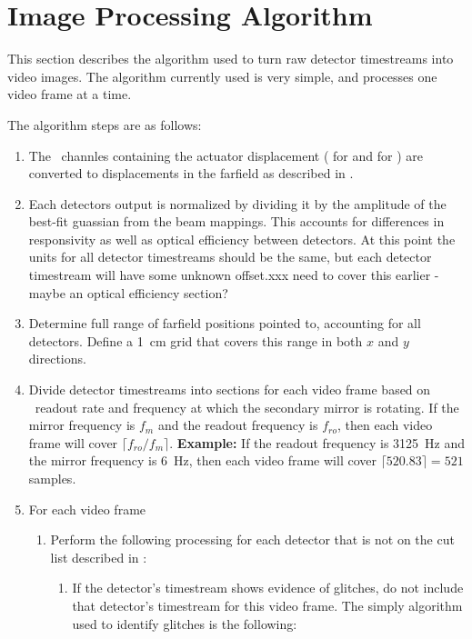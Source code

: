 \section{Image Processing Algorithm} \label{sec:ch8-algo}

This section describes the algorithm used to turn raw detector timestreams into video images.
The algorithm currently used is very simple, and processes one video frame at a time.

The algorithm steps are as follows:
\begin{enumerate}
\item The  \MCE\ channles containing the actuator displacement ( for  and  for ) are converted to displacements in the farfield as described in .
\item Each detectors output is normalized by dividing it by the amplitude of the best-fit guassian from the beam mappings. This accounts for differences in responsivity as well as optical efficiency between detectors. At this point the units for all detector timestreams should be the same, but each detector timestream will have some unknown offset.xxx need to cover this earlier - maybe an optical efficiency section?
\item Determine full range of farfield positions pointed to, accounting for all detectors. Define a \SI{1}{\cm} grid that covers this range in both $x$ and $y$ directions.
\item Divide detector timestreams into sections for each video frame based on \MCE\ readout rate and frequency at which the secondary mirror is rotating.
  If the mirror frequency is $f_m$ and the readout frequency is $f_{ro}$, then each video frame will cover $\lceil f_{ro} / f_{m} \rceil$.
  \textbf{Example:} If the readout frequency is \SI{3125}{\Hz} and the mirror frequency is \SI{6}{\Hz}, then each video frame will cover $\lceil 520.83 \rceil = 521$ samples.
\item For each video frame
  \begin{enumerate}
  \item Perform the following processing for each detector that is not on the cut list described in :
    \begin{enumerate}
    \item If the detector's timestream shows evidence of glitches, do not include that detector's timestream for this video frame. The simply algorithm used to identify glitches is the following:

\end{enumerate}
\end{enumerate}
\end{enumerate}
